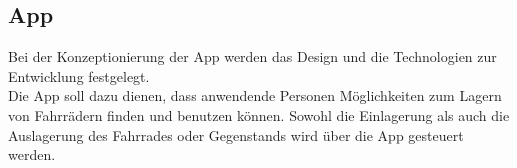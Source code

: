 \subsection{App}
Bei der Konzeptionierung der App werden das Design und die Technologien zur Entwicklung festgelegt.\\
Die App soll dazu dienen, dass anwendende Personen Möglichkeiten zum Lagern von Fahrrädern finden und benutzen können. Sowohl die Einlagerung als auch die Auslagerung des Fahrrades oder Gegenstands wird über die App gesteuert werden.\\


\clearpage


